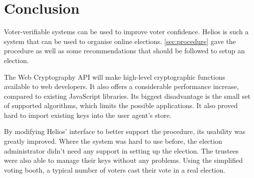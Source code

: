 %
%

\section{Conclusion}

Voter-verifiable systems can be used to improve voter confidence. Helios is such a system that can be used to organise online elections. \ref{sec:procedure} gave the procedure as well as some recommendations that should be followed to setup an election.

\par The Web Cryptography API will make high-level cryptographic functions available to web developers. It also offers a considerable performance increase, compared to existing JavaScript libraries. Its biggest disadvantage is the small set of supported algorithms, which limits the possible applications. It also proved hard to import existing keys into the user agent's store.

\par By modifying Helios' interface to better support the procedure, its usability was greatly improved. Where the system was hard to use before, the election administrator didn't need any support in setting up the election. The trustees were also able to manage their keys without any problems. Using the simplified voting booth, a typical number of voters cast their vote in a real election.